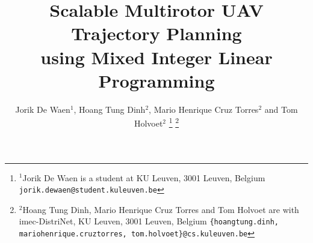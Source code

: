 \documentclass[a4paper, 10pt, conference]{ieeeconf}
\begin{document}
%
\title{Scalable Multirotor UAV Trajectory Planning \\ using Mixed Integer Linear Programming}





\author{Jorik De Waen$^{1}$, Hoang Tung Dinh$^{2}$, Mario Henrique Cruz Torres$^{2}$ and Tom Holvoet$^{2}$%
\thanks{$^{1}$Jorik De Waen is a student at KU Leuven, 3001 Leuven, Belgium
        {\tt\small jorik.dewaen@student.kuleuven.be}}%
\thanks{$^{2}$Hoang Tung Dinh,  Mario Henrique Cruz Torres and Tom Holvoet are with imec-DistriNet, KU Leuven, 3001 Leuven, Belgium
        {\tt\small \{hoangtung.dinh, mariohenrique.cruztorres, tom.holvoet\}@cs.kuleuven.be}}%
}

\maketitle
















\end{document}
